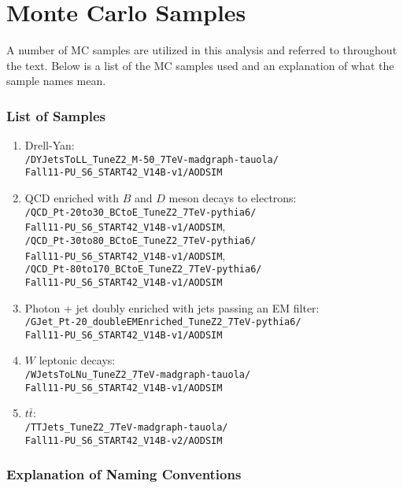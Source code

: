\documentclass[dissertation.tex]{subfiles}
\begin{document}
\appendix
\chapter{Monte Carlo Samples}
\label{chap:Monte Carlo Samples}

A number of MC samples are utilized in this analysis and referred to throughout the text.  Below is a list of the MC samples used and an explanation of what the sample names mean.

\subsection{List of Samples}
\label{sec:List of Samples}

\begin{enumerate}
\item Drell-Yan:\\\verb+/DYJetsToLL_TuneZ2_M-50_7TeV-madgraph-tauola/+\\\verb+Fall11-PU_S6_START42_V14B-v1/AODSIM+
\item QCD enriched with $B$ and $D$ meson decays to electrons:\\\verb+/QCD_Pt-20to30_BCtoE_TuneZ2_7TeV-pythia6/+\\\verb+Fall11-PU_S6_START42_V14B-v1/AODSIM+,\\\verb+/QCD_Pt-30to80_BCtoE_TuneZ2_7TeV-pythia6/+\\\verb+Fall11-PU_S6_START42_V14B-v1/AODSIM+,\\\verb+/QCD_Pt-80to170_BCtoE_TuneZ2_7TeV-pythia6/+\\\verb+Fall11-PU_S6_START42_V14B-v1/AODSIM+
\item Photon + jet doubly enriched with jets passing an EM filter:\\\verb+/GJet_Pt-20_doubleEMEnriched_TuneZ2_7TeV-pythia6/+\\\verb+Fall11-PU_S6_START42_V14B-v1/AODSIM+
\item $W$ leptonic decays:\\\verb+/WJetsToLNu_TuneZ2_7TeV-madgraph-tauola/+\\\verb+Fall11-PU_S6_START42_V14B-v1/AODSIM+
\item $t\bar{t}$:\\\verb+/TTJets_TuneZ2_7TeV-madgraph-tauola/+\\\verb+Fall11-PU_S6_START42_V14B-v2/AODSIM+
\end{enumerate}

\subsection{Explanation of Naming Conventions}
\label{sec:Explanation of Naming Conventions}
\end{document}
